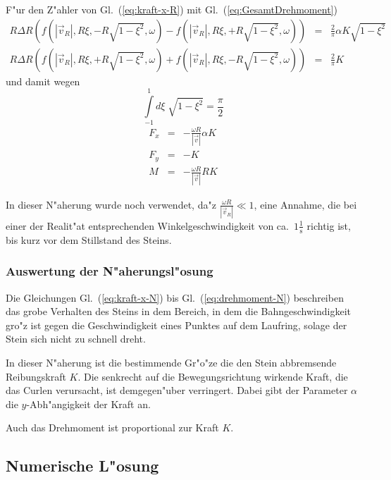 \documentclass[a4paper]{report}
\newcommand{\eqlab}[1]{\label{eq:#1}}
\newcommand{\eqref}[1]{Gl.~(\ref{eq:#1})}
\newcommand{\vRo}{ \vec{v}   }   %
\newcommand{\vRi}{ \vec{v}_R }   %
\newcommand{\SubstCos}{ \sqrt{1-\xi^2} }
\newcommand{\fpolar}[2]{ f( |\vRi| , #2 \xi, #1 #2 \SubstCos ,\omega) }
\newcommand{\Int}{\int\limits}
\begin{document}
\begin{enumerate}
F"ur den Z"ahler von \eqref{kraft-x-R} mit \eqref{GesamtDrehmoment}
%
\begin{eqnarray}
R \Delta R \left(\fpolar{-}{R} - \fpolar{+}{R} \right) &=&
\frac{2}{\pi} \alpha K  \SubstCos 		   \\
R \Delta R \left(\fpolar{+}{R} + \fpolar{-}{R} \right) &=&
\frac{2}{\pi} K
\end{eqnarray}
%
und damit wegen
%
\begin{equation}
\Int_{-1}^{1} d\xi\; \SubstCos  = \frac{\pi}{2}
\end{equation}
%
\begin{eqnarray}
F_x &=& - \frac{\omega R}{|\vRo|} \alpha K \eqlab{kraft-x-N}\\
F_y &=& - K				\eqlab{kraft-y-N}\\
M   &=& - \frac{\omega R}{|\vRo|} R K	\eqlab{drehmoment-N}
\end{eqnarray}

\end{enumerate}

In dieser N"aherung wurde noch verwendet, da"z $ \frac{\omega R}{|\vRi|}\ll 1 $, eine
Annahme, die bei einer der Realit"at entsprechenden Winkelgeschwindigkeit von
ca.\ $ 1\frac{1}{ \textrm{s} } $ richtig ist, bis kurz vor dem Stillstand des Steins.

\subsubsection{Auswertung der N"aherungsl"osung}

Die Gleichungen \eqref{kraft-x-N} bis \eqref{drehmoment-N} beschreiben das grobe
Verhalten des Steins in dem Bereich, in dem die Bahngeschwindigkeit gro"z ist
gegen die Geschwindigkeit eines Punktes auf dem Laufring, solage der Stein sich
nicht zu schnell dreht.

In dieser N"aherung ist die bestimmende Gr"o"ze die den Stein abbremsende
Reibungskraft $ K $. Die senkrecht auf die Bewegungsrichtung wirkende Kraft, die
das Curlen verursacht, ist demgegen"uber verringert. Dabei gibt der Parameter
$ \alpha $ die $ y $-Abh"angigkeit der Kraft an.

Auch das Drehmoment ist proportional zur Kraft $ K $.

\subsection{Numerische L"osung}
\end{document}
